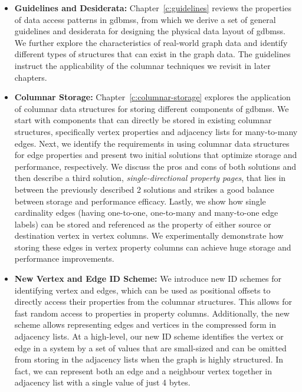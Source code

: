 \begin{itemize}
	\item \textbf{Guidelines and Desiderata:} Chapter~\ref{c:guidelines} reviews the properties of data access patterns in \gls{gdbms}s, from which we derive a set of general guidelines and desiderata for designing the physical data layout of \gls{gdbms}s. We further explore the characteristics of real-world graph data and identify different types of structures that can exist in the graph data. The guidelines instruct the applicability of the columnar techniques we revisit in later chapters.%
	
	\item \textbf{Columnar Storage:} Chapter~\ref{c:columnar-storage} explores the application of columnar data structures for storing different components of \gls{gdbms}s. We start with components that can directly be stored in existing columnar structures, specifically vertex properties and adjacency lists for many-to-many edges. Next, we identify the requirements in using columnar data structures for edge properties and present two initial solutions that optimize storage and performance, respectively. We discuss the pros and cons of both solutions and then describe a third solution, \emph{single-directional property pages}, that lies in between the previously described 2 solutions and strikes a good balance between storage and performance efficacy. Lastly, we show how single cardinality edges (having one-to-one, one-to-many and many-to-one edge labels) can be stored and referenced as the property of either source or destination vertex in vertex columns. We experimentally demonstrate how storing these edges in vertex property columns can achieve huge storage and performance improvements.
	
	\item \textbf{New Vertex and Edge ID Scheme:} We introduce new ID schemes for identifying vertex and edges, which can be used as positional offsets to directly access their properties from the columnar structures. This allows for fast random access to properties in property columns. Additionally, the new scheme allows representing edges and vertices in the compressed form in adjacency lists. At a high-level, our new ID scheme identifies the vertex or edge in a system by a set of values that are small-sized and can be omitted from storing in the adjacency lists when the graph is highly structured. In fact, we can represent both an edge and a neighbour vertex together in adjacency list with a single value of just 4 bytes. 
		

\end{itemize}
